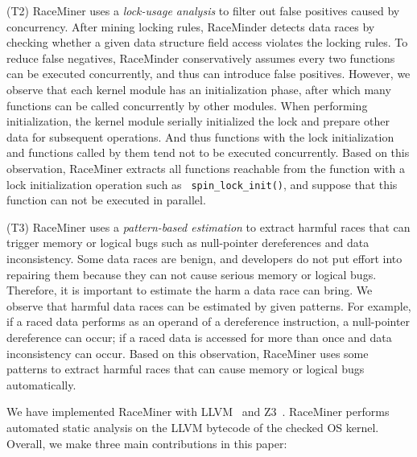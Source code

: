 (T2) RaceMiner uses a {\em lock-usage analysis} to filter out false positives 
caused by concurrency. After mining locking rules, RaceMinder detects data 
races by checking whether a given data structure field access violates the 
locking rules. To reduce false negatives, RaceMinder conservatively assumes 
every two functions can be executed concurrently, and thus can introduce false 
positives. However, we observe that each kernel module has an initialization 
phase, after which many functions can be called concurrently by other modules. 
When performing initialization, the kernel module serially initialized the lock 
and prepare other data for subsequent operations. And thus functions with the 
lock initialization and functions called by them tend not to be executed 
concurrently. Based on this observation, RaceMiner extracts all functions 
reachable from the function with a lock initialization operation such as {\tt 
spin\_lock\_init()}, and suppose that this function can not be executed in 
parallel.

(T3) RaceMiner uses a {\em pattern-based estimation} to extract harmful races 
that can trigger memory or logical bugs such as null-pointer dereferences and 
data inconsistency. Some data races are benign, and developers do not put 
effort into repairing them because they can not cause serious memory or logical 
bugs. Therefore, it is important to estimate the harm a data race can bring. We 
observe that harmful data races can be estimated by given patterns. For 
example, if a raced data performs as an operand of a dereference instruction, a 
null-pointer dereference can occur; if a raced data is accessed for more than 
once and data inconsistency can occur. Based on this observation, RaceMiner 
uses some patterns to extract harmful races that can cause memory or logical 
bugs automatically.

We have implemented RaceMiner with LLVM~\cite{clang} and Z3~\cite{z3}. 
RaceMiner performs automated static analysis on the LLVM bytecode of the 
checked OS kernel. Overall, we make three main contributions in this paper:

